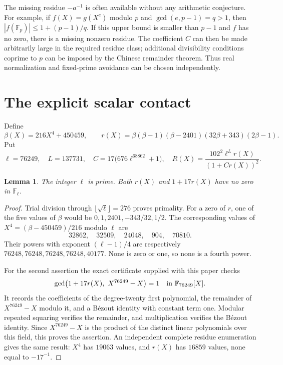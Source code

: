 \documentclass[11pt,a4paper]{article}
\newtheorem{lemma}[theorem]{Lemma}
\begin{document}
The missing residue $-a^{-1}$ is often available without any
arithmetic conjecture. For example, if $f(X)=g(X^e)$ modulo
$p$ and $\gcd(e,p-1)=q>1$, then
$|f(\mathbb F_p)|\le1+(p-1)/q$. If this upper bound is smaller
than $p-1$ and $f$ has no zero, there is a missing nonzero
residue. The coefficient $C$ can then be made arbitrarily
large in the required residue class; additional divisibility
conditions coprime to $p$ can be imposed by the Chinese
remainder theorem. Thus real normalization and fixed-prime
avoidance can be chosen independently.

\section{The explicit scalar contact}

Define
\[
 \beta(X)=216X^4+450459,
 \qquad r(X)=\beta(\beta-1)(\beta-2401)(32\beta+343)(2\beta-1).
\]
Put
\begin{equation}\label{eq:constants}
 \ell=76249,\quad L=137731,\quad
 C=17\bigl(676\ell^{68862}+1\bigr),\quad
 R(X)=\frac{102^2\ell^L r(X)}{(1+C r(X))^2}.
\end{equation}

\begin{lemma}\label{lem:residues}
The integer $\ell$ is prime. Both $r(X)$ and $1+17r(X)$ have
no zero in $\mathbb F_\ell$.
\end{lemma}
\begin{proof}
Trial division through $\lfloor\sqrt\ell\rfloor=276$ proves
primality. For a zero of $r$, one of the five values of $\beta$
would be $0,1,2401,-343/32,1/2$. The corresponding values of
$X^4=(\beta-450459)/216$ modulo $\ell$ are
\[
 32862,\quad32509,\quad24048,\quad904,\quad70810.
\]
Their powers with exponent $(\ell-1)/4$ are respectively
$76248,76248,76248,76248,40177$. None is zero or one, so none
is a fourth power.

For the second assertion the exact certificate supplied with
this paper checks
\[
 \gcd\bigl(1+17r(X),\ X^{76249}-X\bigr)=1
       \quad\hbox{in }\mathbb F_{76249}[X].
\]
It records the coefficients of the degree-twenty first
polynomial, the remainder of $X^{76249}-X$ modulo it, and a
B\'ezout identity with constant term one. Modular repeated
squaring verifies the remainder, and multiplication verifies
the B\'ezout identity. Since $X^{76249}-X$ is the product of
the distinct linear polynomials over this field, this proves
the assertion. An independent complete residue enumeration
gives the same result: $X^4$ has $19063$ values, and $r(X)$
has $16859$ values, none equal to $-17^{-1}$.
\end{proof}
\end{document}
